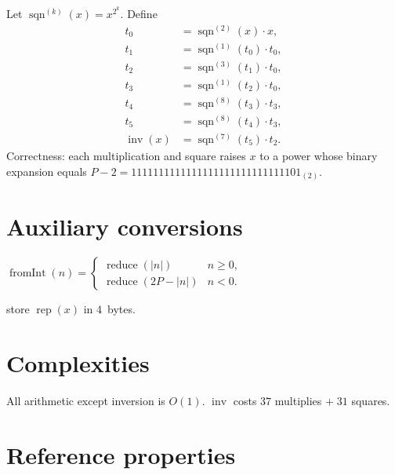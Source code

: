 \documentclass{article}
\begin{document}
Let $\operatorname{sqn}^{(k)}(x)=x^{2^{k}}$.  
Define
\[
\begin{aligned}
t_{0}&=\operatorname{sqn}^{(2)}(x)\cdot x,\\
t_{1}&=\operatorname{sqn}^{(1)}(t_{0})\cdot t_{0},\\
t_{2}&=\operatorname{sqn}^{(3)}(t_{1})\cdot t_{0},\\
t_{3}&=\operatorname{sqn}^{(1)}(t_{2})\cdot t_{0},\\
t_{4}&=\operatorname{sqn}^{(8)}(t_{3})\cdot t_{3},\\
t_{5}&=\operatorname{sqn}^{(8)}(t_{4})\cdot t_{3},\\[4pt]
\operatorname{inv}(x)&=\operatorname{sqn}^{(7)}(t_{5})\cdot t_{2}.
\end{aligned}
\]
Correctness: each multiplication and square
raises $x$ to a power whose binary expansion equals
$P-2=1111111111111111111111111111101_{(2)}$.

\section{Auxiliary conversions}

\begin{description}[style=nextline,labelwidth=3.2cm,leftmargin=3.3cm]
\item[Int\,$\to$\,$\mathbb{F}_{P}$:]
      \(
        \operatorname{fromInt}(n)=
        \begin{cases}
            \operatorname{reduce}(\lvert n\rvert) & n\ge0,\\[4pt]
            \operatorname{reduce}(2P-\lvert n\rvert) & n<0.
        \end{cases}
      \)

\item[$\mathbb{F}_{P}$\,$\to$\,little-endian bytes:]
      store $\operatorname{rep}(x)$ in $4$~bytes.
\end{description}

\section{Complexities}

All arithmetic except inversion is $O(1)$.  
\(\operatorname{inv}\) costs \(37\) multiplies \(+\;31\) squares.

\section{Reference properties}
\end{document}
